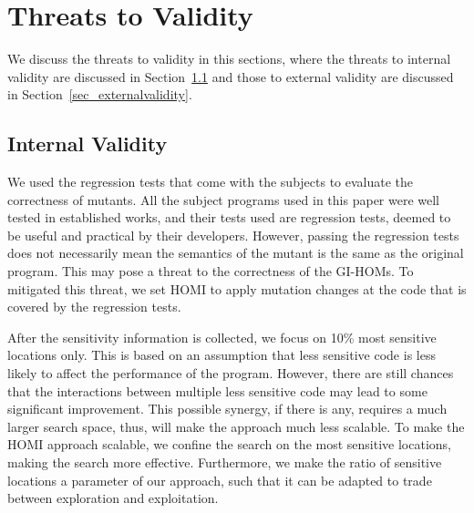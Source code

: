 \documentclass[oribibl]{llncs}
\begin{document}
{%



\section{Threats to Validity}
\label{sec_threat}

We discuss the threats to validity in this sections, where the threats to internal validity are discussed in Section~\ref{sec_internalvalidity} and those to external validity are discussed in Section~\ref{sec_externalvalidity}.

\subsection{Internal Validity}
\label{sec_internalvalidity}

We used the regression tests that come with the subjects to evaluate the correctness of mutants. All the subject programs used in this paper were well tested in established works,  and their tests used are regression tests, deemed to be useful and practical by their developers.
However, passing the regression tests does not necessarily mean the semantics of the mutant is the same as the original program. This may pose a threat to the correctness of the GI-HOMs.  To mitigated this threat, we set HOMI to apply mutation changes at the code that is covered by the regression tests. 

After the sensitivity information is collected, we focus on 10\% most sensitive locations only.
This is based on an assumption that less sensitive code is less likely to affect the performance of the program.
However, there are still chances that the interactions between multiple less sensitive code may lead to some significant improvement.
This possible synergy, if there is any, requires a much larger search space, thus, will make the approach much less scalable.
To make the HOMI approach scalable, we confine the search on the most sensitive locations, making the search more effective.
Furthermore, we make the ratio of sensitive locations a parameter of our approach, such that it can be adapted to trade between exploration and exploitation.

}
\end{document}
